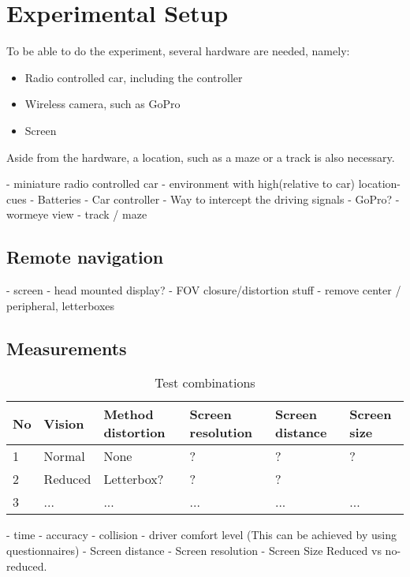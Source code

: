 \chapter{Experimental Setup}
To be able to do the experiment, several hardware are needed, namely:

\begin{itemize}
  \item Radio controlled car, including the controller
  \item Wireless camera, such as GoPro
  \item Screen
\end{itemize}

Aside from the hardware, a location, such as a maze or a track is also necessary. 

- miniature radio controlled car
- environment with high(relative to car) location-cues
- Batteries
- Car controller
- Way to intercept the driving signals
- GoPro?
- wormeye view
- track / maze

\section{Remote navigation}
- screen
- head mounted display?
- FOV closure/distortion stuff
- remove center / peripheral, letterboxes


\section{Measurements}
\begin{table}[h]
\begin{tabular}{|l|lllll|}
\hline
No & Vision  & Method distortion & Screen resolution & Screen distance & Screen size \\\hline
1  & Normal  & None              & ?                 & ?               & ?           \\
2  & Reduced & Letterbox?        & ?                 & ?               &             \\
3  & ...     & ...               & ...               & ...             & ...        \\\hline
\end{tabular}
\caption{Test combinations}
\end{table}

- time
- accuracy
- collision
- driver comfort level (This can be achieved by using questionnaires)
- Screen distance
- Screen resolution
- Screen Size
Reduced vs no-reduced.


